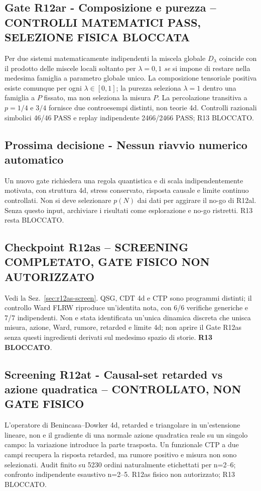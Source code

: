 \documentclass[11pt,a4paper]{article}
\begin{document}
\subsection*{Gate R12ar - Composizione e purezza -- CONTROLLI MATEMATICI PASS, SELEZIONE FISICA BLOCCATA}
Per due sistemi matematicamente indipendenti la miscela globale $D_\lambda$ coincide con il prodotto delle miscele locali soltanto per $\lambda=0,1$ \emph{se} si impone di restare nella medesima famiglia a parametro globale unico. La composizione tensoriale positiva esiste comunque per ogni $\lambda\in[0,1]$; la purezza seleziona $\lambda=1$ dentro una famiglia a $P$ fissato, ma non seleziona la misura $P$. La percolazione transitiva a $p=1/4$ e $3/4$ fornisce due controesempi distinti, non teorie 4d. Controlli razionali simbolici 46/46 PASS e replay indipendente 2466/2466 PASS; R13 BLOCCATO.

\subsection*{Prossima decisione - Nessun riavvio numerico automatico}
Un nuovo gate richiedera una regola quantistica e di scala indipendentemente motivata, con struttura 4d, stress conservato, risposta causale e limite continuo controllati. Non si deve selezionare $p(N)$ dai dati per aggirare il no-go di R12al. Senza questo input, archiviare i risultati come esplorazione e no-go ristretti. R13 resta BLOCCATO.

\subsection*{Checkpoint R12as -- SCREENING COMPLETATO, GATE FISICO NON AUTORIZZATO}
Vedi la Sez.~\ref{sec:r12as-screen}. QSG, CDT 4d e CTP sono programmi distinti; il controllo Ward FLRW riproduce un'identita nota, con 6/6 verifiche generiche e 7/7 indipendenti. Non e stata identificata un'unica dinamica discreta che unisca misura, azione, Ward, rumore, retarded e limite 4d; non aprire il Gate R12as senza questi ingredienti derivati sul medesimo spazio di storie. \textbf{R13 BLOCCATO}.

\subsection*{Screening R12at - Causal-set retarded vs azione quadratica -- CONTROLLATO, NON GATE FISICO}
L'operatore di Benincasa--Dowker 4d, retarded e triangolare in un'estensione lineare, non e il gradiente di una normale azione quadratica reale su un singolo campo: la variazione introduce la parte trasposta. Un funzionale CTP a due campi recupera la risposta retarded, ma rumore positivo e misura non sono selezionati. Audit finito su 5230 ordini naturalmente etichettati per n=2--6; confronto indipendente esaustivo n=2--5. R12as fisico non autorizzato; R13 BLOCCATO.
\end{document}
